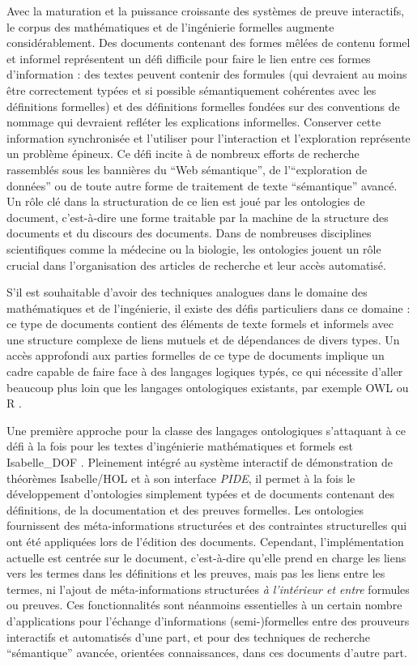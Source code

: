 \documentclass[a4paper,10pt]{article}
\begin{document}
Avec la maturation et la puissance croissante
des systèmes de preuve interactifs,
le corpus des mathématiques et de l'ingénierie formelles augmente considérablement.
Des documents contenant
des formes mêlées de contenu formel et informel représentent
un défi difficile pour faire le lien entre ces formes d'information :
des textes peuvent contenir des formules
(qui devraient au moins être correctement typées
et si possible sémantiquement cohérentes avec les définitions formelles)
et des définitions formelles fondées sur des conventions de nommage
qui devraient refléter les explications informelles.
Conserver cette information synchronisée
et l'utiliser pour l'interaction et l'exploration représente
un problème épineux.
Ce défi incite à de nombreux efforts de recherche
rassemblés sous les bannières du \enquote{Web sémantique},
de l'\enquote{exploration de données}
ou de toute autre forme de traitement de texte \enquote{sémantique} avancé.
Un rôle clé dans la structuration de ce lien est joué
par les ontologies de document,
c'est-à-dire une forme traitable par la machine de la structure des documents
et du discours des documents.
Dans de nombreuses disciplines scientifiques comme la médecine ou la biologie,
les ontologies jouent un rôle crucial
dans l'organisation des articles de recherche et leur accès automatisé.

S'il est souhaitable d'avoir des techniques analogues
dans le domaine des mathématiques et de l'ingénierie,
il existe des défis particuliers dans ce domaine :
ce type de documents contient des éléments de texte formels et informels
avec une structure complexe de liens mutuels et de dépendances de divers types.
Un accès approfondi aux parties formelles de ce type de documents implique
un cadre capable de faire face à des langages logiques typés,
ce qui nécessite d'aller beaucoup plus loin
que les langages ontologiques existants,
par exemple OWL ou R \cite {owl2012,protege,owlgred,rontorium}.

Une première approche pour la classe des langages ontologiques
s'attaquant à ce défi
à la fois pour les textes d'ingénierie mathématiques et formels est
Isabelle\_DOF
\cite{
  Brucker-ea.Using-CICM18,
  BruckerWolff.Design-SEFM19,
  BruckerWolff.Certif-IFM19%
}.
Pleinement intégré
au système interactif de démonstration de théorèmes Isabelle/HOL
et à son interface \emph{PIDE},
il permet à la fois le développement d'ontologies simplement typées
et de documents contenant des définitions, de la documentation
et des preuves formelles.
Les ontologies fournissent des méta-informations structurées
et des contraintes structurelles
qui ont été appliquées lors de l'édition des documents.
Cependant, l'implémentation actuelle est centrée sur le document,
c'est-à-dire qu'elle prend en charge les liens vers les termes
dans les définitions et les preuves,
mais pas les liens entre les termes,
ni l'ajout de méta-informations structurées
\emph{à l'intérieur et entre} formules ou preuves.
Ces fonctionnalités sont néanmoins
essentielles à un certain nombre d'applications
pour l'échange d'informations (semi-)formelles
entre des prouveurs interactifs et automatisés d'une part,
et pour des techniques de recherche \enquote{sémantique} avancée,
orientées connaissances, dans ces documents d'autre part.
\end{document}
